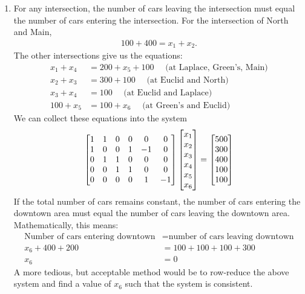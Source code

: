 \documentclass{article}
\begin{document}
\begin{enumerate}
\item %
For any intersection, the number of cars leaving the intersection must equal the number of cars entering the intersection. For the intersection of North and Main,
\begin{align*}
 100+400 = x_1+x_2.
\end{align*}
The other intersections give us the equations:
\begin{align*}
 x_1+x_4 &=200+x_5+100 \quad \text{ (at Laplace, Green's, Main)}\\
 x_2+x_3 &=300+100 \quad \text{ (at Euclid and North)}\\
 x_3+x_4 &=100 \quad \text{ (at Euclid and Laplace)}\\
 100+x_5 &=100+x_6 \quad \text{ (at Green's and Euclid)}
\end{align*}
We can collect these equations into the system
\begin{align*}
\begin{bmatrix} 
1 & 1 & 0 & 0 & 0 & 0 \\
1 & 0 & 0 & 1 &-1 & 0 \\
0 & 1 & 1 & 0 & 0 & 0 \\
0 & 0 & 1 & 1 & 0 & 0 \\
0 & 0 & 0 & 0 & 1 & -1
\end{bmatrix} 
\begin{bmatrix} x_1 \\ x_2 \\ x_3 \\ x_4 \\ x_5 \\ x_6 \end{bmatrix}
= \begin{bmatrix} 500 \\ 300 \\ 400 \\100\\100\end{bmatrix}
\end{align*}
If the total number of cars remains constant, the number of cars entering the downtown area must equal the number of cars leaving the downtown area. Mathematically, this means:
\begin{align*}
  \text{Number of cars entering downtown} &= \text{number of cars leaving downtown} \\
  x_6 + 400 + 200 &= 100 + 100 + 100 + 300 \\
  x_6 &= 0
\end{align*}
A more tedious, but acceptable method would be to row-reduce the above system and find a value of $x_6$ such that the system is consistent.



\end{enumerate}
\end{document}
